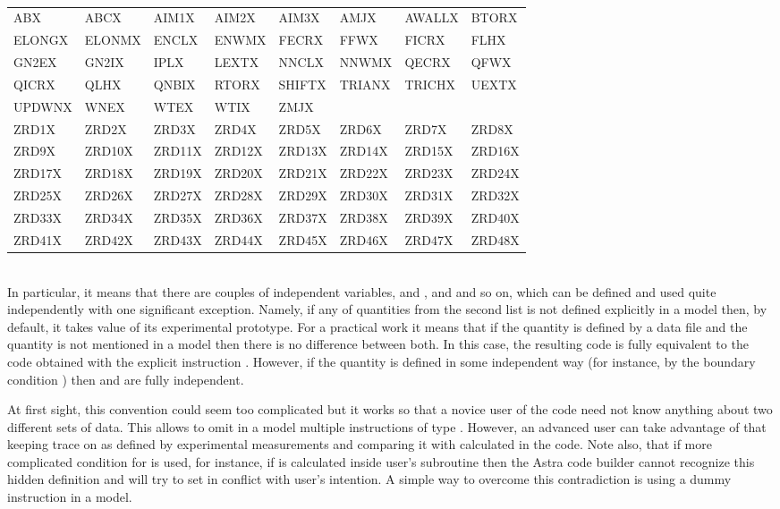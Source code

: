 {\tt
\begin{tabular}{|p{15mm}p{15mm}p{15mm}p{15mm}p{15mm}p{15mm}p{15mm}p{15mm}|}
\hline
ABX	&ABCX	&AIM1X	&AIM2X	&AIM3X	&AMJX	&AWALLX	&BTORX	\\
ELONGX	&ELONMX	&ENCLX	&ENWMX	&FECRX	&FFWX	&FICRX	&FLHX	\\
GN2EX	&GN2IX	&IPLX	&LEXTX	&NNCLX	&NNWMX	&QECRX	&QFWX	\\
QICRX	&QLHX	&QNBIX	&RTORX	&SHIFTX	&TRIANX	&TRICHX	&UEXTX	\\
UPDWNX	&WNEX	&WTEX	&WTIX	&ZMJX	&	&	&	\\
ZRD1X	&ZRD2X	&ZRD3X	&ZRD4X	&ZRD5X	&ZRD6X	&ZRD7X	&ZRD8X	\\
ZRD9X	&ZRD10X	&ZRD11X	&ZRD12X	&ZRD13X	&ZRD14X	&ZRD15X	&ZRD16X	\\
ZRD17X	&ZRD18X	&ZRD19X	&ZRD20X	&ZRD21X	&ZRD22X	&ZRD23X	&ZRD24X	\\
ZRD25X	&ZRD26X	&ZRD27X	&ZRD28X	&ZRD29X	&ZRD30X	&ZRD31X	&ZRD32X	\\
ZRD33X	&ZRD34X	&ZRD35X	&ZRD36X	&ZRD37X	&ZRD38X	&ZRD39X	&ZRD40X	\\
ZRD41X	&ZRD42X	&ZRD43X	&ZRD44X	&ZRD45X	&ZRD46X	&ZRD47X	&ZRD48X	\\
\hline
\end{tabular}
}\\[10pt]
In particular, it means that there are couples of independent variables,
 and ,  and  and so on, which can be
defined and used quite independently with one significant exception.
Namely, if any of quantities from the second list is not defined
explicitly in a model then, by default, it takes value of its
experimental prototype. 
For a practical work it means that if the quantity 
is defined by a data file and the quantity  is not
mentioned in a model then there is no difference between both.
In this case, the resulting code is fully equivalent to the code
obtained with the explicit instruction .
However, if the quantity  is defined in some independent way
(for instance, by the boundary condition ) then 
 and  are fully independent. 

At first sight, this convention could seem too complicated but
it works so that a novice user of the code need not know anything
about two different sets of data. 
This allows to omit in a model multiple instructions of type 
.
However, an advanced user can take advantage of that keeping trace
on  as defined by experimental measurements and comparing
it with  calculated in the code.
Note also, that if more complicated condition for  is used,
for instance, if  is calculated inside user's subroutine 
then the Astra code builder cannot recognize this hidden definition
and will try to set  in conflict with user's intention.
A simple way to overcome this contradiction is using a dummy
instruction  in a model.

